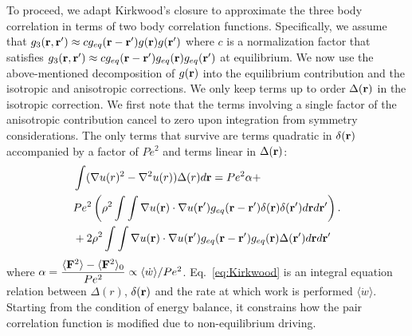 \documentclass[pre,amsmath,preprintnumbers,10pt,article,notitlepage,twocolumn]{revtex4-1}
\begin{document}
To proceed, we adapt Kirkwood's closure to approximate the three body correlation in terms of two body correlation functions. Specifically, we assume that $g_3({\bf r},{\bf r}^\prime)\approx c g_{eq}({\bf r} - {\bf r}^\prime) g({\bf r}) g({\bf r}^\prime)$ where $c$ is a normalization factor that satisfies $g_{3}({\bf {r} , \bf {r}'}) \approx c g_{eq}({\bf r} - {\bf r}^\prime) g_{eq}({\bf r})  g_{eq}({\bf r}') $ at equilibrium. %
We now use the above-mentioned decomposition of $g({\bf r})$ into the equilibrium contribution and the isotropic and anisotropic corrections. We only keep terms up to order $\Delta ({\bf r})$ in the isotropic correction. We first note that the terms involving a single factor of the anisotropic contribution cancel to zero upon integration from symmetry considerations. The only terms that survive are terms quadratic in $\delta({\bf r})$ accompanied by a factor of $Pe^2$ and terms linear in $\Delta({\bf r})$:
\begin{equation}
\begin{split}
&\int (\nabla u(r)^2 - \nabla^2 u(r))  \Delta(r) d{\bf r}  = Pe^2 \alpha +\\ &Pe^2\left( \rho^2 \int \int \nabla u({\bf r}) \cdot \nabla u({\bf r}') g_{eq}({\bf r} - {\bf r}') \delta({\bf r}) \delta({\bf r}') d{\bf r} d{\bf r}' \right) .   \\
& +2 \rho^2  \int \int \nabla u({\bf r}) \cdot \nabla u({\bf r}') g_{eq}({\bf r} - {\bf r}') g_{eq}({\bf r}) \Delta ({\bf r}')  d{\bf r} d{\bf r}'
\end{split}
\label{eq:Kirkwood}
\end{equation}
where $\alpha = \dfrac{\langle {\bf F}^2 \rangle - \langle {\bf F}^2 \rangle_0}{Pe^2}\propto \langle \dot{w} \rangle/Pe^2$. Eq.~\ref{eq:Kirkwood} is an integral equation relation between $\Delta (r)$, $\delta({\bf r})$ and the rate at which work is performed $\langle \dot{w}\rangle$. Starting from the condition of energy balance, it constrains how the pair correlation function is modified due to non-equilibrium driving. 
\end{document}
